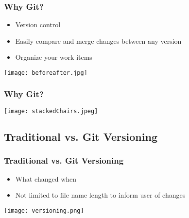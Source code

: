 \documentclass{beamer}
\begin{document}
\begin{frame}
\frametitle{Why Git?}
\begin{itemize}
\item Version control
\item Easily compare and merge changes between any version
\item Organize your work items
\end{itemize}
\begin{center}\texttt{[image: beforeafter.jpg]}\end{center}
\end{frame}

\begin{frame}
\frametitle{Why Git?}
\begin{center}\texttt{[image: stackedChairs.jpeg]}\end{center}
\end{frame}

\subsection{Traditional vs. Git Versioning}

\begin{frame}[fragile]
\frametitle{Traditional vs. Git Versioning}
\begin{itemize}
\item What changed when
\item Not limited to file name length to inform user of changes
\end{itemize}
\begin{center}\texttt{[image: versioning.png]}\end{center}
\end{frame}
\end{document}
